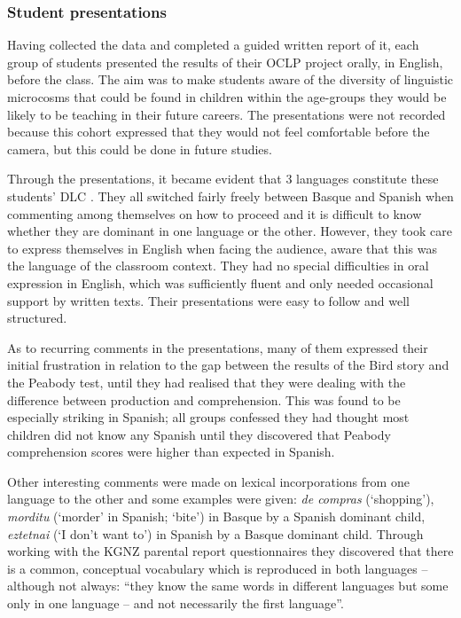 \documentclass[output=paper]{../langscibook}
\begin{document}
\subsubsection{Student presentations}


Having collected the data and completed a guided written report of it, each group of students presented the results of their OCLP project orally, in English, before the class. The aim was to make students aware of the diversity of linguistic microcosms that could be found in children within the age-groups they would be likely to be teaching in their future careers. The presentations were not recorded because this cohort expressed that they would not feel comfortable before the camera, but this could be done in future studies.

Through the presentations, it became evident that 3 languages constitute these students’ DLC \citep{Aronin2016}. They all switched fairly freely between Basque and Spanish when commenting among themselves on how to proceed and it is difficult to know whether they are dominant in one language or the other. However, they took care to express themselves in English when facing the audience, aware that this was the language of the classroom context. They had no special difficulties in oral expression in English, which was sufficiently fluent and only needed occasional support by written texts. Their presentations were easy to follow and well structured.

As to recurring comments in the presentations, many of them expressed their initial frustration in relation to the gap between the results of the Bird story and the Peabody test, until they had realised that they were dealing with the difference between production and comprehension. This was found to be especially striking in Spanish; all groups confessed they had thought most children did not know any Spanish until they discovered that Peabody comprehension scores were higher than expected in Spanish.

Other interesting comments were made on lexical incorporations from one language to the other and some examples were given: \textit{de compras} (`shopping'), \textit{morditu} (`morder' in Spanish; `bite') in Basque by a Spanish dominant child, \textit{eztetnai} (`I don’t want to') in Spanish by a Basque dominant child. Through working with the KGNZ parental report questionnaires they discovered that there is a common, conceptual vocabulary which is reproduced in both languages – although not always: “they know the same words in different languages but some only in one language – and not necessarily the first language”.
\end{document}
